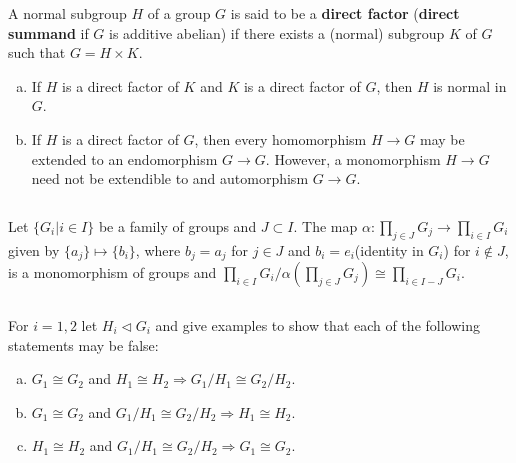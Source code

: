 $$ $$

\begin{ex}
    A normal subgroup $H$ of a group $G$ is said to be a \textbf{direct factor} (\textbf{direct summand} if $G$ is additive abelian) if there exists a (normal) subgroup $K$ of $G$ such that $G=H\times K$.
    \begin{enumerate}[(a)]
        \item If $H$ is a direct factor of $K$ and $K$ is a direct factor of $G$, then $H$ is normal in $G$.
        \item If $H$ is a direct factor of $G$, then every homomorphism $H\to G$ may be extended to an endomorphism $G\to G$. However, a monomorphism $H\to G$ need not be extendible to and automorphism $G\to G$.
    \end{enumerate}
\end{ex}

$$ $$

\begin{ex}
    Let $\{G_{i}|i\in I\}$ be a family of groups and $J\subset I$. The map $\alpha: \prod\limits_{j\in J}G_{j}\to \prod\limits_{i\in I}G_{i}$ given by $\{a_{j}\}\mapsto \{b_{i}\}$, where $b_{j}=a_{j}$ for $j\in J$ and $b_{i}=e_{i}$(identity in $G_{i}$) for $i\notin J$, is a monomorphism of groups and $\prod\limits_{i\in I}G_{i} /\alpha(\prod\limits_{j\in J}G_{j})\cong \prod\limits_{i\in I-J}G_{i}$.
\end{ex}

$$ $$

\begin{ex}
    For $i=1,2$ let $H_{i}\lhd G_{i}$ and give examples to show that each of the following statements may be false:
    \begin{enumerate}[(a)]
        \item $G_{1}\cong G_{2}$ and $H_{1}\cong H_{2}\Rightarrow G_{1} /H_{1}\cong G_{2} /H_{2}$.
        \item $G_{1}\cong G_{2}$ and $G_{1}/ H_{1}\cong G_{2} / H_{2}\Rightarrow H_{1}\cong H_{2}$.
        \item $H_{1}\cong H_{2}$ and $G_{1}/ H_{1}\cong G_{2} / H_{2}\Rightarrow G_{1}\cong G_{2}$.
    \end{enumerate}
\end{ex}